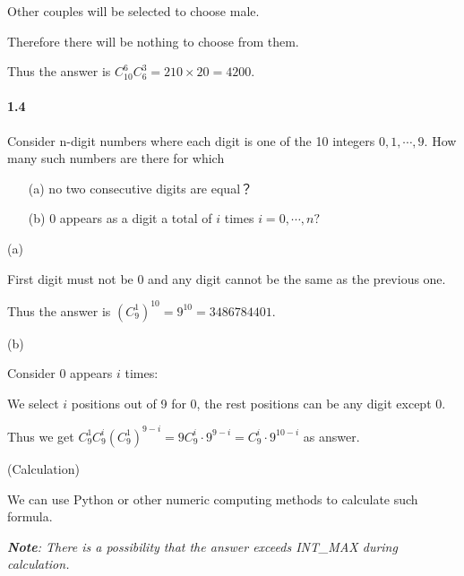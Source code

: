Other couples will be selected to choose male.

Therefore there will be nothing to choose from them.

Thus the answer is $C_{10}^6 C_{6}^3 = 210 \times 20 = 4200$.

\paragraph{1.4}
Consider n-digit numbers where each digit is one of the 10 integers $0, 1, \cdots ,9$. How many such numbers are there for which
\begin{itemize}
    \item[(a)] no two consecutive digits are equal？
    \item[(b)] 0 appears as a digit a total of $i$ times $i = 0,\cdots ,n?$
\end{itemize}

\solution
(a)

First digit must not be 0 and any digit cannot be the same as the previous one.

Thus the answer is ${(C_9^1)}^{10} = 9^{10} = 3486784401$.

(b)

Consider 0 appears $i$ times:

We select $i$ positions out of 9 for 0, the rest positions can be any digit except 0.

Thus we get $C_9^1 C_9^i (C_{9}^{1})^{9-i} = 9 C_9^i \cdot 9^{9-i} = C_9^i \cdot 9^{10-i}$ as answer.

(Calculation)

We can use Python or other numeric computing methods to calculate such formula.

\textit{\textbf{Note}: There is a possibility that the answer exceeds INT\_MAX during calculation.}

\begin{table}[hb]
    \centering
\end{table}

